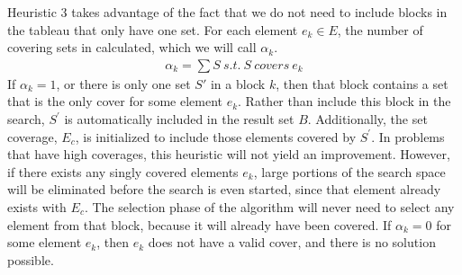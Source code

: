 \documentclass[12pt]{article}
\begin{document}
	Heuristic 3 takes advantage of the fact that we do not need to include blocks in the tableau that only have one set. For each element $e_k \in E$, the number of covering sets in calculated, which we will call $\alpha_k$. 
	\begin{align*}
	\alpha_k = \sum S\:s.t.\:S\:covers\:e_k 
	\end{align*}
	If $\alpha_k = 1$, or there is only one set $S\prime$ in a block $k$, then that block contains a set that is the only cover for some element $e_k$. Rather than include this block in the search, $S^\prime$ is automatically included in the result set $B$. Additionally, the set coverage, $E_c$, is initialized to include those elements covered by $S^\prime$. In problems that have high coverages, this heuristic will not yield an improvement. However, if there exists any singly covered elements $e_k$, large portions of the search space will be eliminated before the search is even started, since that element already exists with $E_c$. The selection phase of the algorithm will never need to select any element from that block, because it will already have been covered.  If $\alpha_k = 0$ for some element $e_k$, then $e_k$ does not have a valid cover, and there is no solution possible.
	
\end{document}
